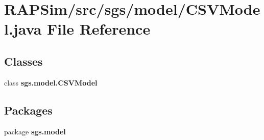 \section{R\-A\-P\-Sim/src/sgs/model/\-C\-S\-V\-Model.java File Reference}
\label{_c_s_v_model_8java}
\subsection*{Classes}
\begin{DoxyCompactItemize}
\item 
class {\bf sgs.\-model.\-C\-S\-V\-Model}
\end{DoxyCompactItemize}
\subsection*{Packages}
\begin{DoxyCompactItemize}
\item 
package {\bf sgs.\-model}
\end{DoxyCompactItemize}
